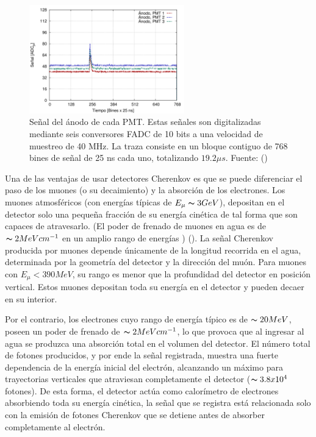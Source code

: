 \begin{figure}[h!]
  \centering
\includegraphics[width=0.6\textwidth]{Figs/PMTs_signal.png}
  \caption{Señal del ánodo de cada PMT. Estas señales son digitalizadas mediante seis conversores FADC de 10 bits a una velocidad de muestreo de 40 MHz. La traza consiste en un bloque contiguo de 768 bines de señal de 25 ns cada uno, totalizando $19.2 \mu s$. Fuente: (\cite{asorey})}
  \label{fig:PMT}
\end{figure}
Una de las ventajas de usar detectores Cherenkov es que se puede diferenciar el paso de los muones (o su decaimiento) y la absorción de los electrones. Los muones atmosféricos (con energías típicas de $E_\mu \thicksim 3GeV$), depositan en el detector solo una pequeña fracción de su energía cinética de tal forma que son capaces de atravesarlo. (El poder de frenado de muones en agua es de $\thicksim 2 MeV cm^{-1}$ en un amplio rango de energías ) (\cite{asorey}). La señal Cherenkov producida por muones depende únicamente de la longitud recorrida en el agua, determinada por la geometría del detector y la dirección del muón. Para muones con $E_\mu < 390 MeV$, su rango es menor que la profundidad del detector en posición vertical. Estos muones depositan toda su energía en el detector y pueden decaer en su interior.

Por el contrario, los electrones cuyo rango de energía típico es de $\thicksim 20MeV$, poseen un poder de frenado de $\thicksim 2MeV cm^{-1}$, lo que provoca que al ingresar al agua se produzca una absorción total en el volumen del detector. El número total de fotones producidos, y por ende la señal registrada, muestra una fuerte dependencia de la energía inicial del electrón, alcanzando un máximo para trayectorias verticales que atraviesan completamente el detector ($\thicksim 3.8 x 10^{4}$ fotones). De esta forma, el detector actúa como calorímetro de electrones absorbiendo toda su energía cinética, la señal que se registra está relacionada solo con la emisión de fotones Cherenkov que se detiene antes de absorber completamente al electrón. 

